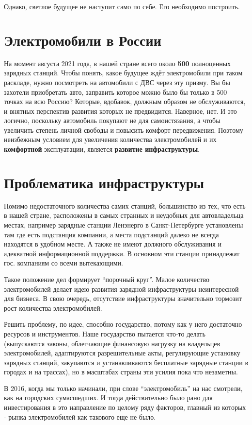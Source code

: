 \documentclass[a4paper,12pt]{report}
\begin{document}
Однако, светлое будущее не наступит само по себе. Его необходимо построить. 

\section{Электромобили в России}
На момент августа 2021 года, в нашей стране всего около \textbf{500} полноценных зарядных станций. Чтобы понять, какое будущее ждёт электромобили при таком раскладе, нужно посмотреть на автомобили с ДВС через эту призму. Вы бы захотели приобретать авто, заправить которое можно было бы только в 500 точках на всю Россию? Которые, вдобавок, должным образом не обслуживаются, и внятных перспектив развития которых не предвидится. Наверное, нет. И это логично, поскольку автомобиль покупают не для самоистязания, а чтобы увеличить степень личной свободы и повысить комфорт передвижения. Поэтому неизбежным условием для увеличения количества электромобилей и их \textbf{комфортной} эксплуатации, является \textbf{развитие инфраструктуры}. 

\section{Проблематика инфраструктуры}
Помимо недостаточного количества самих станций, большинство из тех, что есть в нашей стране, расположены в самых странных и неудобных для автовладельца местах, например зарядные станции Ленэнерго в Санкт-Петербурге установлены там где есть подстанция компании, а места подстанций далеко не всегда находятся в удобном месте. А также не имеют должного обслуживания и адекватной информационной поддержки. В основном эти станции принадлежат гос. компаниям со всеми вытекающими.

Такое положение дел формирует “порочный круг”. Малое количество электромобилей делает идею развития зарядной инфраструктуры неинтересной для бизнеса. В свою очередь, отсутствие инфраструктуры значительно тормозит рост количества электромобилей. 

Решить проблему, по идее, способно государство, потому как у него достаточно ресурсов и инструментов. Наше государство пытается что-то делать (выпускаются законы, облегчающие финансовую нагрузку на владельцев электромобилей, адаптируются разрешительные акты, регулирующие установку зарядных станций, закупаются и устанавливаются бесплатные зарядные станции в городах и на трассах), но в масштабах страны эти усилия пока что незаметны. 

В 2016, когда мы только начинали, при слове “электромобиль” на нас смотрели, как на городских сумасшедших. И тогда действительно было рано для инвестирования в это направление по целому ряду факторов, главный из которых - рынка электромобилей как такового еще не было. 
\end{document}

